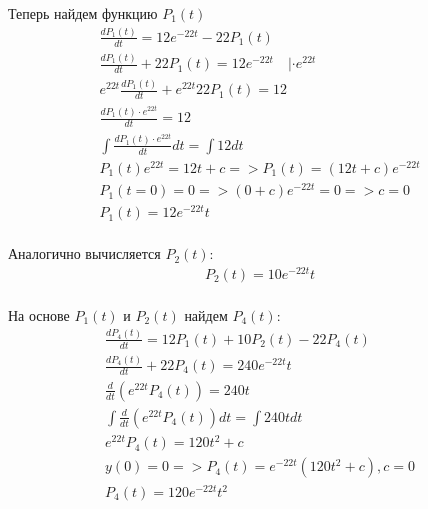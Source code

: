 Теперь найдем функцию $P_1 (t)$
\begin{gather*}
    \frac{d P_1(t)}{dt} = 12 e^{-22 t} - 22 P_1(t)\\
    \frac{d P_1(t)}{dt} + 22 P_1(t) = 12 e^{ -22 t} \quad |\cdot e^{ 22 t} \\
    e^{ 22 t} \frac{d P_1(t)}{dt} + e^{ 22 t} 22 P_1(t) = 12\\
    \frac{d P_1(t) \cdot e^{ 22 t }}{dt} = 12\\
    \int \frac{d P_1(t) \cdot e^{ 22 t } }{dt} dt = \int 12 dt\\
    P_1(t) e^{ 22 t } = 12 t + c => P_1(t) = ( 12 t + c) e^{ -22 t } \\
    P_1(t=0) = 0 => ( 0 + c ) e^{ -22 t } = 0 => c=0\\
    P_1(t) = 12 e^{ -22 t } t\\
\end{gather*}

Аналогично вычисляется $P_2 (t)$:
\begin{gather*}
    P_2(t) = 10 e^{- 22 t}t\\
\end{gather*}

На основе $P_1 (t)$ и $P_2 (t)$ найдем $P_4 (t)$:
\begin{gather*}
    \frac{d P_4(t)}{dt} = 12 P_1 (t) + 10 P_2 (t) - 22 P_4(t)\\
    \frac{d P_4(t)}{dt} + 22 P_4(t) = 240 e^{- 22 t} t\\
    \frac{d}{dt} (e^{ 22 t} P_4(t)) = 240 t\\
    \int \frac{d}{dt} (e^{ 22 t} P_4(t)) dt = \int 240 t dt\\
    e^{ 22 t} P_4(t) = 120 t^2 + c \\
    y(0) = 0 => P_4(t) = e^{ -22 t} ( 120 t^2 + c), c = 0 \\
    P_4(t) = 120 e^{ -22 t} t^2\\
\end{gather*}


